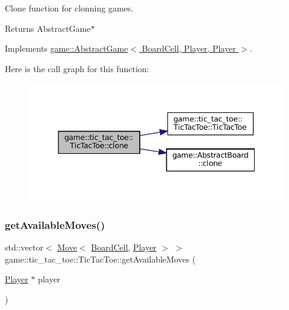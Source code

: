 Clone function for clonning games. 

\begin{DoxyReturn}{Returns}
Abstract\+Game$\ast$ 
\end{DoxyReturn}


Implements \hyperlink{classgame_1_1_abstract_game_a226baac1f32a8f6672d922675ffddbf6}{game\+::\+Abstract\+Game$<$ Board\+Cell, Player, Player $>$}.

Here is the call graph for this function\+:
\nopagebreak
\begin{figure}[H]
\begin{center}
\leavevmode
\includegraphics[width=345pt]{classgame_1_1tic__tac__toe_1_1_tic_tac_toe_a11f31f44ee9ebe8c394bcc9f2a74fab4_cgraph}
\end{center}
\end{figure}
\mbox{\label{classgame_1_1tic__tac__toe_1_1_tic_tac_toe_af5dd08e48f442a4f54402423e996887f}} 
\subsubsection{\texorpdfstring{get\+Available\+Moves()}{getAvailableMoves()}}
{\footnotesize\ttfamily std\+::vector$<$ \hyperlink{structgame_1_1_move}{Move}$<$ \hyperlink{classgame_1_1tic__tac__toe_1_1_board_cell}{Board\+Cell}, \hyperlink{classgame_1_1tic__tac__toe_1_1_player}{Player} $>$ $>$ game\+::tic\+\_\+tac\+\_\+toe\+::\+Tic\+Tac\+Toe\+::get\+Available\+Moves (\begin{DoxyParamCaption}\item[{\hyperlink{classgame_1_1tic__tac__toe_1_1_player}{Player} $\ast$}]{player }\end{DoxyParamCaption})\hspace{0.3cm}{\ttfamily [override]}}

